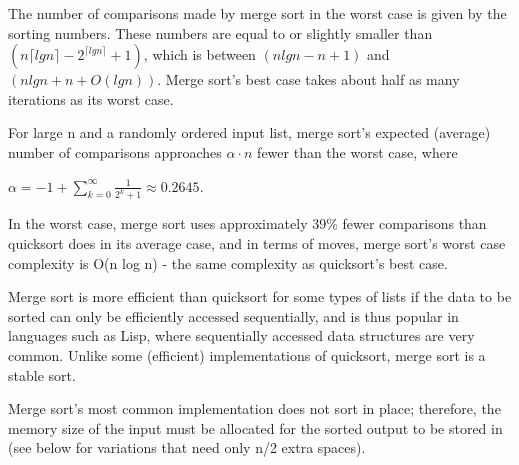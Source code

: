 \documentclass{article}
\begin{document}
The number of comparisons made by merge sort in the worst case is given by the sorting numbers. These numbers are equal to or slightly smaller than$ (n  {\lceil} lg n{\rceil}  - 2 ^ {{\lceil} lg n{\rceil}}  + 1)$, which is between $ (n lg n - n + 1) $ and $(n lg n + n + O(lg n))$. Merge sort's best case takes about half as many iterations as its worst case.

For large n and a randomly ordered input list, merge sort's expected (average) number of comparisons approaches ${\alpha} {\cdot} n$ fewer than the worst case, where

${\displaystyle {\alpha} =-1+\sum _{k=0}^{\infty }{\frac {1}{2^{k}+1}}\approx 0.2645.}$

In the worst case, merge sort uses approximately 39\% fewer comparisons than quicksort does in its average case, and in terms of moves, merge sort's worst case complexity is O(n log n) - the same complexity as quicksort's best case.

Merge sort is more efficient than quicksort for some types of lists if the data to be sorted can only be efficiently accessed sequentially, and is thus popular in languages such as Lisp, where sequentially accessed data structures are very common. Unlike some (efficient) implementations of quicksort, merge sort is a stable sort.

Merge sort's most common implementation does not sort in place; therefore, the memory size of the input must be allocated for the sorted output to be stored in (see below for variations that need only n/2 extra spaces).
\newpage
\end{document}
